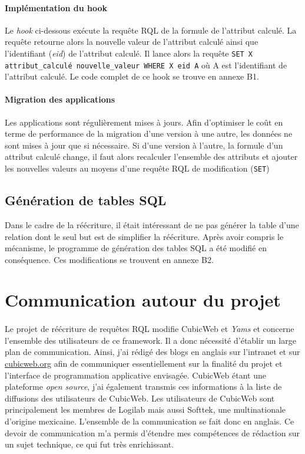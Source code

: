 \documentclass {report}
\begin{document}
\paragraph{Implémentation du hook}
Le \textit{hook} ci-dessous exécute la requête RQL de la formule de l'attribut calculé. La requête retourne alors la nouvelle valeur de l'attribut calculé ainsi que l'identifiant (\textit{eid}) de l'attribut calculé. Il lance alors la requête \verb+SET X attribut_calculé nouvelle_valeur WHERE X eid A+ où A est l'identifiant de l'attribut calculé. Le code complet de ce hook se trouve en annexe B1.

\paragraph{Migration des applications}
Les applications sont régulièrement mises à jours. Afin d'optimiser le coût en terme de performance de la migration d'une version à une autre, les données ne sont mises à jour que si nécessaire. Si d'une version à l'autre, la formule d'un attribut calculé change, il faut alors recalculer l'ensemble des attributs et ajouter les nouvelles valeurs au moyens d'une requête RQL de modification (\verb+SET+)

\subsection{Génération de tables SQL}
Dans le cadre de la réécriture, il était intéressant de ne pas générer la table d'une relation dont le seul but est de simplifier la réécriture. Après avoir compris le mécanisme, le programme de génération des tables SQL a été modifié en conséquence. Ces modifications se trouvent en annexe B2.


\section{Communication autour du projet}
\paragraph{}
Le projet de réécriture de requêtes RQL modifie CubicWeb et \textit{Yams} et concerne l'ensemble des utilisateurs de ce framework. Il a donc nécessité d'établir un large plan de communication. Ainsi, j'ai rédigé des blogs en anglais sur l'intranet et sur \url{cubicweb.org} afin de communiquer essentiellement sur la finalité du projet et l'interface de programmation applicative envisagée. CubicWeb étant une plateforme \textit{open source}, j'ai également transmis ces informations à la liste de diffusions des utilisateurs de CubicWeb. Les utilisateurs de CubicWeb sont principalement les membres de Logilab mais aussi Softtek, une multinationale d'origine mexicaine. L'ensemble de la communication se fait donc en anglais. Ce devoir de communication m'a permis d'étendre mes compétences de rédaction sur un sujet technique, ce qui fut très enrichissant.
\end{document}
